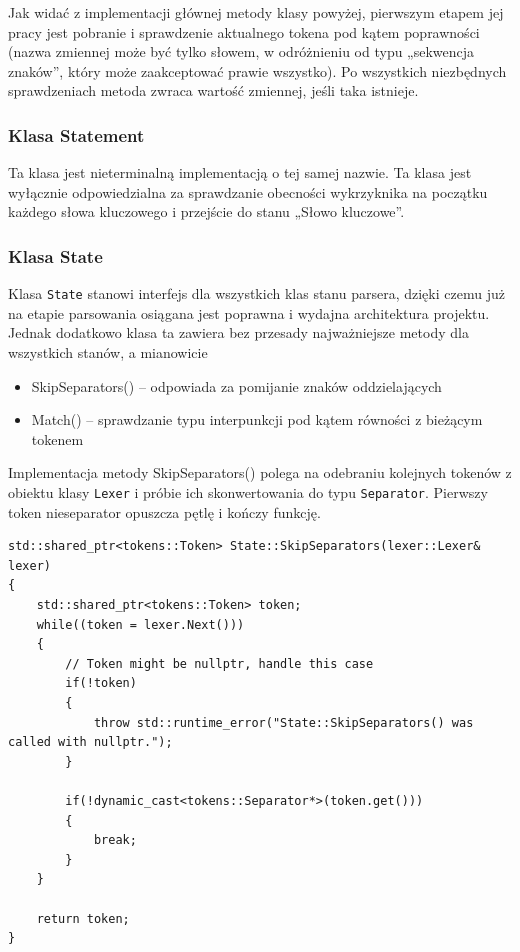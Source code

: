 Jak widać z implementacji głównej metody klasy powyżej, pierwszym etapem jej pracy jest pobranie i sprawdzenie aktualnego tokena pod kątem poprawności (nazwa zmiennej może być tylko słowem, w odróżnieniu od typu „sekwencja znaków”, który może zaakceptować prawie wszystko). Po wszystkich niezbędnych sprawdzeniach metoda zwraca wartość zmiennej, jeśli taka istnieje.

\subsubsection{Klasa Statement}

Ta klasa jest nieterminalną implementacją o tej samej nazwie. Ta klasa jest wyłącznie odpowiedzialna za sprawdzanie obecności wykrzyknika na początku każdego słowa kluczowego i przejście do stanu „Słowo kluczowe”.

\subsubsection{Klasa State}

Klasa \texttt{State} stanowi interfejs dla wszystkich klas stanu parsera, dzięki czemu już na etapie parsowania osiągana jest poprawna i wydajna architektura projektu. Jednak dodatkowo klasa ta zawiera bez przesady najważniejsze metody dla wszystkich stanów, a mianowicie

\begin{itemize}
	\item SkipSeparators() -- odpowiada za pomijanie znaków oddzielających
	\item Match() -- sprawdzanie typu interpunkcji pod kątem równości z bieżącym tokenem
\end{itemize}

Implementacja metody SkipSeparators() polega na odebraniu kolejnych tokenów z obiektu klasy \texttt{Lexer} i próbie ich skonwertowania do typu \texttt{Separator}. Pierwszy token nieseparator opuszcza pętlę i kończy funkcję.

\begin{lstlisting}[label=list:separator_skip,caption=Metoda State::SkipSeparators(),basicstyle=\footnotesize\ttfamily]
std::shared_ptr<tokens::Token> State::SkipSeparators(lexer::Lexer& lexer)
{
    std::shared_ptr<tokens::Token> token;
    while((token = lexer.Next()))
    {
        // Token might be nullptr, handle this case
        if(!token)
        {
            throw std::runtime_error("State::SkipSeparators() was called with nullptr.");
        }
    
        if(!dynamic_cast<tokens::Separator*>(token.get()))
        {
            break;
        }
    }
    
    return token;
}
\end{lstlisting}

